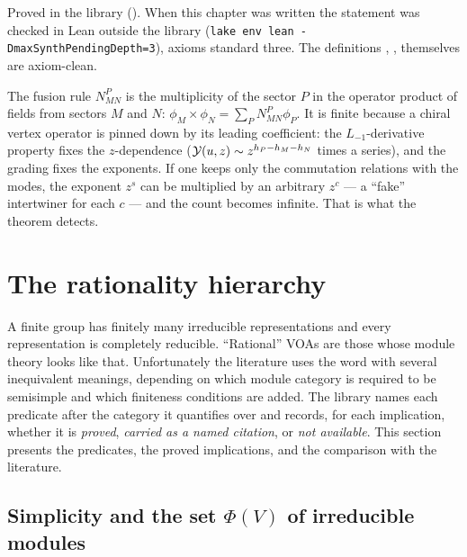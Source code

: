 \begin{status}
Proved in the library (). When this chapter was written the statement was checked in Lean
outside the library (\texttt{lake env lean -DmaxSynthPendingDepth=3}), axioms standard three. The definitions
, ,  themselves are axiom-clean.
\end{status}

\begin{physics}
The fusion rule $N_{MN}^P$ is the multiplicity of the sector $P$ in the operator product of fields from sectors $M$ and $N$:
$\phi_M\times\phi_N = \sum_PN_{MN}^P\phi_P$. It is finite because a chiral vertex operator is pinned down by its leading
coefficient: the $L_{-1}$-derivative property fixes the $z$-dependence ($\mathcal{Y}(u,z)\sim z^{h_P-h_M-h_N}$ times a series),
and the grading fixes the exponents. If one keeps only the commutation relations with the modes, the exponent $z^{s}$ can be
multiplied by an arbitrary $z^c$ --- a ``fake'' intertwiner for each $c$ --- and the count becomes infinite. That is what the
theorem detects.
\end{physics}

\section{The rationality hierarchy}\label{l12:sec:rationality}

A finite group has finitely many irreducible representations and every representation is completely reducible.
``Rational'' VOAs are those whose module theory looks like that. Unfortunately the literature uses the word with
several inequivalent meanings, depending on which module category is required to be semisimple and which
finiteness conditions are added. The library names each predicate after the category it quantifies over and
records, for each implication, whether it is \emph{proved}, \emph{carried as a named citation}, or \emph{not
available}. This section presents the predicates, the proved implications, and the comparison with the literature.

\subsection{Simplicity and the set \texorpdfstring{$\Phi(V)$}{Phi(V)} of irreducible modules}

